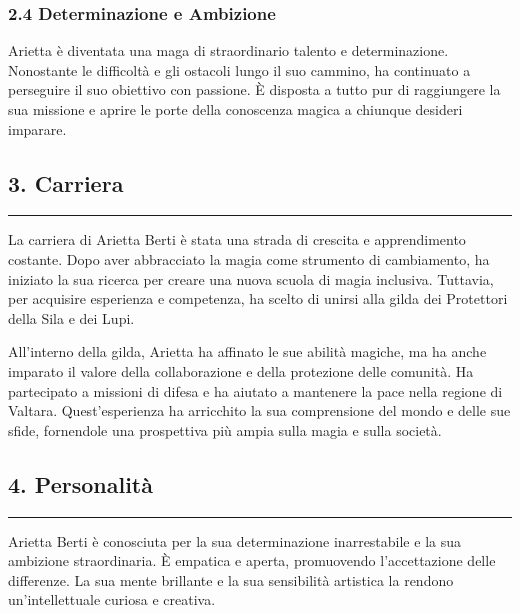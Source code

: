 \subsubsection{\texorpdfstring{2.4 \textbf{Determinazione e
Ambizione}}{2.4 Determinazione e Ambizione}}\label{determinazione-e-ambizione}

Arietta è diventata una maga di straordinario talento e determinazione.
Nonostante le difficoltà e gli ostacoli lungo il suo cammino, ha
continuato a perseguire il suo obiettivo con passione. È disposta a
tutto pur di raggiungere la sua missione e aprire le porte della
conoscenza magica a chiunque desideri imparare.

\subsection{3. Carriera}\label{carriera}

\begin{center}\rule{0.5\linewidth}{0.5pt}\end{center}

La carriera di Arietta Berti è stata una strada di crescita e
apprendimento costante. Dopo aver abbracciato la magia come strumento di
cambiamento, ha iniziato la sua ricerca per creare una nuova scuola di
magia inclusiva. Tuttavia, per acquisire esperienza e competenza, ha
scelto di unirsi alla gilda dei Protettori della Sila e dei Lupi.

All'interno della gilda, Arietta ha affinato le sue abilità magiche, ma
ha anche imparato il valore della collaborazione e della protezione
delle comunità. Ha partecipato a missioni di difesa e ha aiutato a
mantenere la pace nella regione di Valtara. Quest'esperienza ha
arricchito la sua comprensione del mondo e delle sue sfide, fornendole
una prospettiva più ampia sulla magia e sulla società.

\subsection{4. Personalità}\label{personalituxe0}

\begin{center}\rule{0.5\linewidth}{0.5pt}\end{center}

Arietta Berti è conosciuta per la sua determinazione inarrestabile e la
sua ambizione straordinaria. È empatica e aperta, promuovendo
l'accettazione delle differenze. La sua mente brillante e la sua
sensibilità artistica la rendono un'intellettuale curiosa e creativa.

